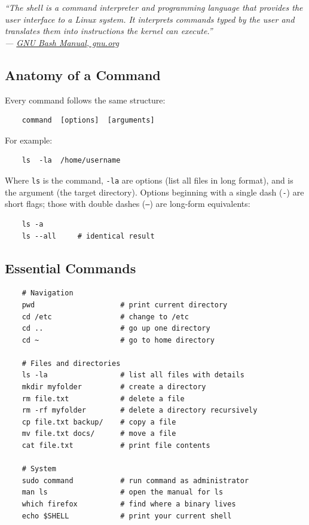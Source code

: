 \documentclass{article}
\newcommand{\code}[1]{\colorbox{codebg}{\texttt{#1}}}
\begin{document}
\begin{mdframed}[linewidth=1.5pt, linecolor=black!50, topline=true, bottomline=true,
	leftline=false, rightline=false, backgroundcolor=black!3]
	\small\itshape
	``The shell is a command interpreter and programming language that provides the
	user interface to a Linux system. It interprets commands typed by the user
	and translates them into instructions the kernel can execute.''\\[4pt]
	\normalfont\small ---
	\href{https://www.gnu.org/software/bash/manual/bash.html}{GNU Bash Manual,
		gnu.org}
\end{mdframed}

\subsection{Anatomy of a Command}

Every command follows the same structure:

\begin{verbatim}
	command  [options]  [arguments]
\end{verbatim}

For example:

\begin{verbatim}
	ls  -la  /home/username
\end{verbatim}

Where \code{ls} is the command, \code{-la} are options (list all files in long
format), and  is the argument (the target directory).
Options beginning with a single dash (\code{-}) are short flags; those with double
dashes (\code{--}) are long-form equivalents:

\begin{verbatim}
	ls -a
	ls --all     # identical result
\end{verbatim}

\subsection{Essential Commands}

\begin{verbatim}
	# Navigation
	pwd                    # print current directory
	cd /etc                # change to /etc
	cd ..                  # go up one directory
	cd ~                   # go to home directory
	
	# Files and directories
	ls -la                 # list all files with details
	mkdir myfolder         # create a directory
	rm file.txt            # delete a file
	rm -rf myfolder        # delete a directory recursively
	cp file.txt backup/    # copy a file
	mv file.txt docs/      # move a file
	cat file.txt           # print file contents
	
	# System
	sudo command           # run command as administrator
	man ls                 # open the manual for ls
	which firefox          # find where a binary lives
	echo $SHELL            # print your current shell
\end{verbatim}
\end{document}
